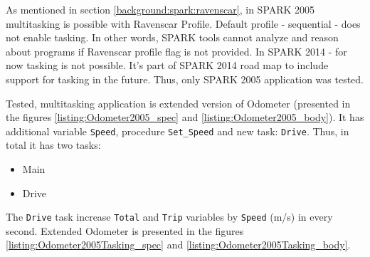 As mentioned in section \ref{background:spark:ravenscar}, in SPARK 2005 multitasking is possible with Ravenscar Profile. Default profile - sequential -  does not enable tasking. In other words, SPARK tools cannot analyze and reason about programs if Ravenscar profile flag is not provided. In SPARK 2014 - for now tasking is not possible. It's part of SPARK 2014 road map to include support for tasking in the future. Thus, only SPARK 2005 application was tested.

Tested, multitasking application is extended version of Odometer (presented in the figures \ref{listing:Odometer2005_spec} and \ref{listing:Odometer2005_body}). It has additional variable \lstinline{Speed}, procedure \lstinline{Set_Speed} and new task: \lstinline{Drive}. Thus, in total it has two tasks:
\begin{itemize}
    \item Main
    \item Drive
\end{itemize}

The \lstinline{Drive} task increase \lstinline{Total} and \lstinline{Trip} variables by \lstinline{Speed} (m/s) in every second. Extended Odometer is presented in the figures \ref{listing:Odometer2005Tasking_spec} and \ref{listing:Odometer2005Tasking_body}. 

